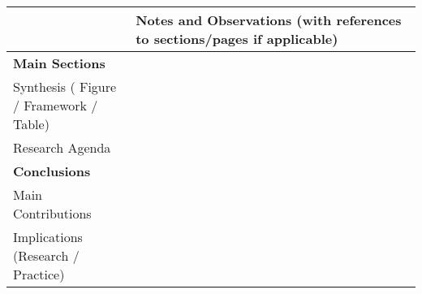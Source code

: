\documentclass[11pt]{scrartcl}
\theoremstyle{aufgabenstyle}
\begin{document}
\vspace{1cm}

{\small
	\begin{longtable}{|p{0.3\linewidth}|p{0.7\linewidth}|}
		\hline
		& \textbf{Notes and Observations} (with references to sections/pages if applicable) \\
		\hline
		
		\textbf{Main Sections} & \\
		Synthesis \newline ( Figure / Framework / Table) & \\[14em] \hline
		Research Agenda & \\[14em]
		\hline
		\textbf{Conclusions} & \\
		Main Contributions & \\[10em] \hline
		Implications \newline  (Research / Practice) & \\[10em]
		\hline
	\end{longtable}
}
\end{document}
